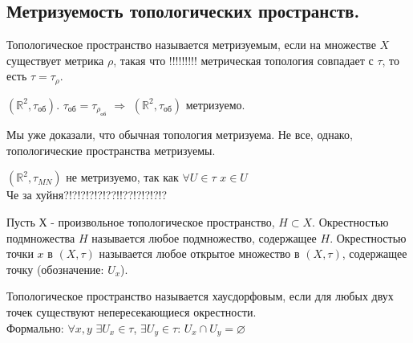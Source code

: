 \subsection{Метризуемость топологических пространств.}
\begin{definition}
    Топологическое пространство называется метризуемым, если на множестве $X$ существует метрика $\rho$, такая что !!!!!!!!! метрическая топология совпадает с $\tau$, то есть $\tau=\tau_{\rho}$.
\end{definition}
\begin{example}
$(\mathbb{R}^2,\tau_{\text{об}})$. $\tau_{\text{об}}=\tau_{\rho_{\text{об}}}$ $\Rightarrow$ $(\mathbb{R}^2,\tau_{\text{об}})$ метризуемо.
\end{example}
Мы уже доказали, что обычная топология метризуема. Не все, однако, 
топологические пространства метризуемы. 
\begin{example}
$(\mathbb{R}^2,\tau_{MN})$ не метризуемо, так как $\forall U{\in}\tau$ $x{\in}U$\\
Че за хуйня?!?!?!?!?!??!!??!?!?!?!?
\end{example}
\begin{definition}
Пусть Х - произвольное топологическое пространство, $H\subset X$. Окрестностью подмножества $H$ называется любое подмножество, содержащее $H$.
Окрестностью точки $x$ в $(X,\tau)$ называется любое открытое множество в $(X,\tau)$, содержащее точку (обозначение: $U_x$).
\end{definition}
\begin{definition}
Топологическое пространство называется хаусдорфовым, если для любых двух точек существуют непересекающиеся окрестности.\\
Формально: $\forall x,y$ $\exists U_x{\in}\tau$, $\exists U_y{\in}\tau$: $U_{x}{\cap}U_{y}=\varnothing$
\end{definition}
